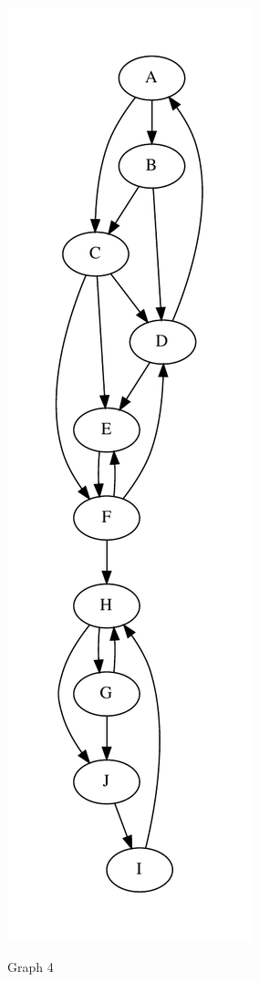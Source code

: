 \documentclass{article}
\begin{document}
\begin{figure}
\centering
\includegraphics[scale=0.4]{g4.pdf}
\label{Figure 1: }
\caption{Graph 4}
\end{figure}
\end{document}
